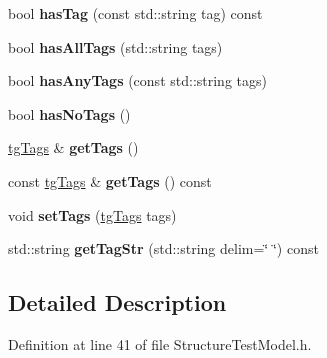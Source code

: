 \begin{DoxyCompactItemize}
\item 
\hypertarget{classtg_taggable_ae31f65869c8887bfeb34a344902c4d5b}{bool {\bfseries has\-Tag} (const std\-::string tag) const }\label{classtg_taggable_ae31f65869c8887bfeb34a344902c4d5b}

\item 
\hypertarget{classtg_taggable_a33b77b1075171b63f673965687b2e844}{bool {\bfseries has\-All\-Tags} (std\-::string tags)}\label{classtg_taggable_a33b77b1075171b63f673965687b2e844}

\item 
\hypertarget{classtg_taggable_af14af28fa98021c4f20a5e8f2ddd5606}{bool {\bfseries has\-Any\-Tags} (const std\-::string tags)}\label{classtg_taggable_af14af28fa98021c4f20a5e8f2ddd5606}

\item 
\hypertarget{classtg_taggable_adff345e116e16420c701a748ff8f995f}{bool {\bfseries has\-No\-Tags} ()}\label{classtg_taggable_adff345e116e16420c701a748ff8f995f}

\item 
\hypertarget{classtg_taggable_acf1d7fa9df8f374f25015c4080902681}{\hyperlink{classtg_tags}{tg\-Tags} \& {\bfseries get\-Tags} ()}\label{classtg_taggable_acf1d7fa9df8f374f25015c4080902681}

\item 
\hypertarget{classtg_taggable_ae70d7d3b45301665bc363b0ed8b9b292}{const \hyperlink{classtg_tags}{tg\-Tags} \& {\bfseries get\-Tags} () const }\label{classtg_taggable_ae70d7d3b45301665bc363b0ed8b9b292}

\item 
\hypertarget{classtg_taggable_a5492888e4e4da4cca6261070b5726adf}{void {\bfseries set\-Tags} (\hyperlink{classtg_tags}{tg\-Tags} tags)}\label{classtg_taggable_a5492888e4e4da4cca6261070b5726adf}

\item 
\hypertarget{classtg_taggable_a346d66b066d2d9eb1eadba01da43749f}{std\-::string {\bfseries get\-Tag\-Str} (std\-::string delim=\char`\"{} \char`\"{}) const }\label{classtg_taggable_a346d66b066d2d9eb1eadba01da43749f}

\end{DoxyCompactItemize}


\subsection{Detailed Description}


Definition at line 41 of file Structure\-Test\-Model.\-h.



